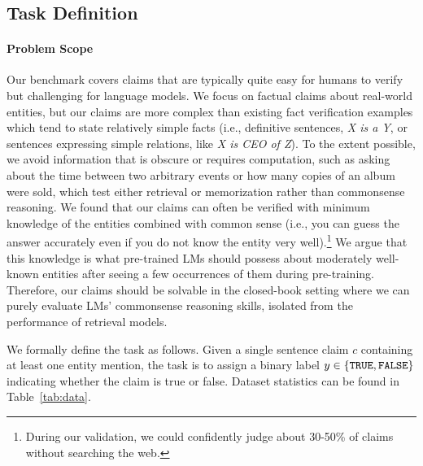 \section{\textsc{\ours}}\label{sec:dataset}

\subsection{Task Definition}
\paragraph{Problem Scope} Our benchmark covers claims that are typically quite easy for humans to verify but challenging for language models. We focus on factual claims about real-world entities, but our claims are more complex than existing fact verification examples which tend to state relatively simple facts (i.e., definitive sentences, \emph{X is a Y}, or sentences expressing simple relations, like \emph{X is CEO of Z}). To the extent possible, we avoid information that is obscure or requires computation, such as asking about the time between two arbitrary events or how many copies of an album were sold, which test either retrieval or memorization rather than commonsense reasoning. We found that our claims can often be verified with minimum knowledge of the entities combined with common sense (i.e., you can guess the answer accurately even if you do not know the entity very well).\footnote{During our validation, we could confidently judge about 30-50\% of claims without searching the web.} We argue that this knowledge is what pre-trained LMs should possess about moderately well-known entities after seeing a few occurrences of them during pre-training. Therefore, our claims should be solvable in the closed-book setting where we can purely evaluate LMs' commonsense reasoning skills, isolated from the performance of retrieval models.    

We formally define the \textsc{\ours} task as follows. Given a single sentence claim $c$ containing at least one entity mention, the task is to assign a binary label $y \in \{{\tt TRUE, FALSE}\}$ indicating whether the claim is true or false. Dataset statistics can be found in Table~\ref{tab:data}.

